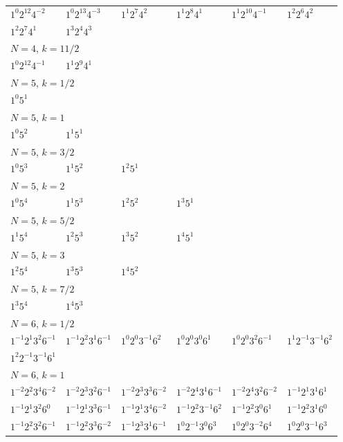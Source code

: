 \documentclass[12pt]{amsart}
\numberwithin{equation}{section}
\theoremstyle{plain}
\theoremstyle{definition}
\theoremstyle{remark}
\begin{document}
\begin{longtable}{llllll}
$1^{0}2^{12}4^{-2}$ & $1^{0}2^{13}4^{-3}$ & $1^{1}2^{7}4^{2}$ & $1^{1}2^{8}4^{1}$ & $1^{1}2^{10}4^{-1}$ & $1^{2}2^{6}4^{2}$\\
$1^{2}2^{7}4^{1}$ & $1^{3}2^{4}4^{3}$ & &&&\\
\midrule
\multicolumn{6}{l}{$N=4$, $k=11/2$}\\
$1^{0}2^{12}4^{-1}$ & $1^{1}2^{9}4^{1}$ & &&&\\
\midrule
\multicolumn{6}{l}{$N=5$, $k=1/2$}\\
$1^{0}5^{1}$ & &&&&\\
\midrule
\multicolumn{6}{l}{$N=5$, $k=1$}\\
$1^{0}5^{2}$ & $1^{1}5^{1}$ & &&&\\
\midrule
\multicolumn{6}{l}{$N=5$, $k=3/2$}\\
$1^{0}5^{3}$ & $1^{1}5^{2}$ & $1^{2}5^{1}$ & &&\\
\midrule
\multicolumn{6}{l}{$N=5$, $k=2$}\\
$1^{0}5^{4}$ & $1^{1}5^{3}$ & $1^{2}5^{2}$ & $1^{3}5^{1}$ & &\\
\midrule
\multicolumn{6}{l}{$N=5$, $k=5/2$}\\
$1^{1}5^{4}$ & $1^{2}5^{3}$ & $1^{3}5^{2}$ & $1^{4}5^{1}$ & &\\
\midrule
\multicolumn{6}{l}{$N=5$, $k=3$}\\
$1^{2}5^{4}$ & $1^{3}5^{3}$ & $1^{4}5^{2}$ & &&\\
\midrule
\multicolumn{6}{l}{$N=5$, $k=7/2$}\\
$1^{3}5^{4}$ & $1^{4}5^{3}$ & &&&\\
\midrule
\multicolumn{6}{l}{$N=6$, $k=1/2$}\\
$1^{-1}2^{1}3^{2}6^{-1}$ & $1^{-1}2^{2}3^{1}6^{-1}$ & $1^{0}2^{0}3^{-1}6^{2}$ & $1^{0}2^{0}3^{0}6^{1}$ & $1^{0}2^{0}3^{2}6^{-1}$ & $1^{1}2^{-1}3^{-1}6^{2}$\\
$1^{2}2^{-1}3^{-1}6^{1}$ & &&&&\\
\midrule
\multicolumn{6}{l}{$N=6$, $k=1$}\\
$1^{-2}2^{2}3^{4}6^{-2}$ & $1^{-2}2^{3}3^{2}6^{-1}$ & $1^{-2}2^{3}3^{3}6^{-2}$ & $1^{-2}2^{4}3^{1}6^{-1}$ & $1^{-2}2^{4}3^{2}6^{-2}$ & $1^{-1}2^{1}3^{1}6^{1}$\\
$1^{-1}2^{1}3^{2}6^{0}$ & $1^{-1}2^{1}3^{3}6^{-1}$ & $1^{-1}2^{1}3^{4}6^{-2}$ & $1^{-1}2^{2}3^{-1}6^{2}$ & $1^{-1}2^{2}3^{0}6^{1}$ & $1^{-1}2^{2}3^{1}6^{0}$\\
$1^{-1}2^{2}3^{2}6^{-1}$ & $1^{-1}2^{2}3^{3}6^{-2}$ & $1^{-1}2^{3}3^{1}6^{-1}$ & $1^{0}2^{-1}3^{0}6^{3}$ & $1^{0}2^{0}3^{-2}6^{4}$ & $1^{0}2^{0}3^{-1}6^{3}$\\

\end{longtable}
\end{document}
